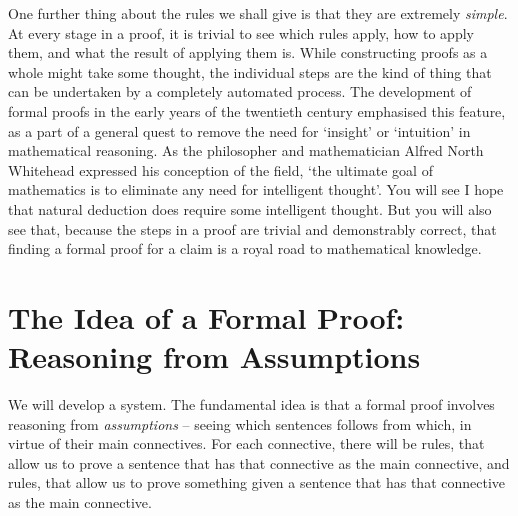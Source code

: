 One further thing about the rules we shall give is that they are extremely \emph{simple}. At every stage in a proof, it is trivial to see which rules apply, how to apply them, and what the result of applying them is. While constructing proofs as a whole might take some thought, the individual steps are the kind of thing that can be undertaken by a completely automated process. The development of formal proofs in the early years of the twentieth century emphasised this feature, as a part of a general quest to remove the need for `insight' or `intuition' in mathematical reasoning. As the philosopher and mathematician Alfred North Whitehead expressed his conception of the field, `the ultimate goal of mathematics is to eliminate any need for intelligent thought'. You will see I hope that natural deduction does require some intelligent thought. But you will also see that, because the steps in a proof are trivial and demonstrably correct, that finding a formal proof for a claim is a royal road to mathematical knowledge. 




\chapter{The Idea of a Formal Proof: Reasoning from Assumptions}\label{c:ass}
We will develop a  system. The fundamental idea is that a formal proof involves reasoning from \emph{assumptions} – seeing which sentences follows from which, in virtue of their main connectives. For each connective, there will be  rules, that allow us to prove a sentence that has that connective as the main connective, and  rules, that allow us to prove something given a sentence that has that connective as the main connective. 

